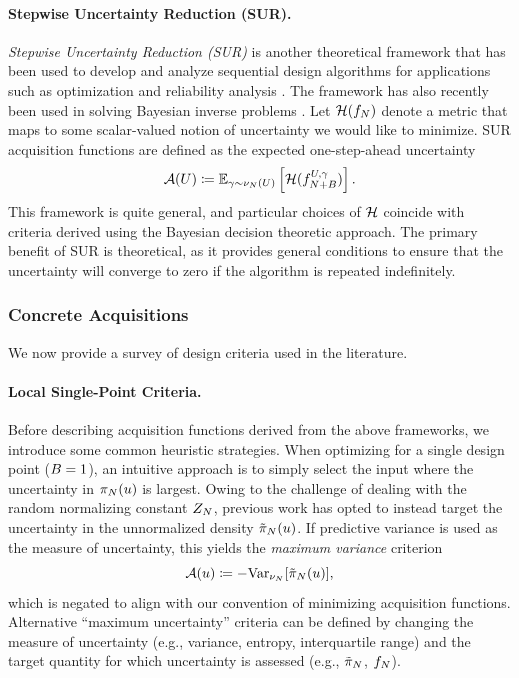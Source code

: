 \documentclass[12pt]{article}
\begin{document}
\paragraph{Stepwise Uncertainty Reduction (SUR).}
\textit{Stepwise Uncertainty Reduction (SUR)} is another theoretical framework that has been used to develop 
and analyze sequential design algorithms for applications such as optimization and 
reliability analysis \citep{supermartingaleSUR,BectSUR}. The
framework has also recently been used in solving Bayesian inverse problems \citep{lartaudSUR}.
Let $\surmetric(\targetEm)$ denote a metric that maps to some scalar-valued notion of uncertainty we would
like to minimize. SUR acquisition functions are defined as the expected one-step-ahead uncertainty
\begin{equation}
\acq(\ParBatch) \Def \E_{\batchResponse \sim \emDist(\ParBatch)}\left[\surmetric(\targetEm[\Naugment]^{\ParBatch,\batchResponse})\right].
\end{equation}
This framework is quite general, and particular choices of $\surmetric$ coincide with criteria derived using the 
Bayesian decision theoretic approach. The primary benefit of SUR is theoretical, as it provides general conditions 
to ensure that the uncertainty will converge to zero if the algorithm is repeated indefinitely. 

\subsubsection{Concrete Acquisitions}
We now provide a survey of design criteria used in the literature.

\paragraph{Local Single-Point Criteria.}
Before describing acquisition functions derived from the above frameworks, we introduce some 
common heuristic strategies. When optimizing for a single design point ($\Nbatch = 1$), an intuitive 
approach is to simply select the input where the uncertainty in $\postNormEm(\Par)$ is largest.
Owing to the challenge of dealing with the random normalizing constant $\normCstEm$,
previous work has opted to instead target the uncertainty in the unnormalized density 
$\postEm(\Par)$. If predictive variance
is used as the measure of uncertainty, this yields the \textit{maximum variance} criterion
\begin{equation}
\acq(\Par) \Def -\Var_{\emDist}[\postEm(\Par)], \label{eq:acq-maxvar}
\end{equation}
which is negated to align with our convention of minimizing acquisition functions.
Alternative ``maximum uncertainty'' criteria can be defined by changing the measure
of uncertainty (e.g., variance, entropy, interquartile range) and the target quantity
for which uncertainty is assessed (e.g., $\postEm$, $\targetEm$). 
\end{document}
